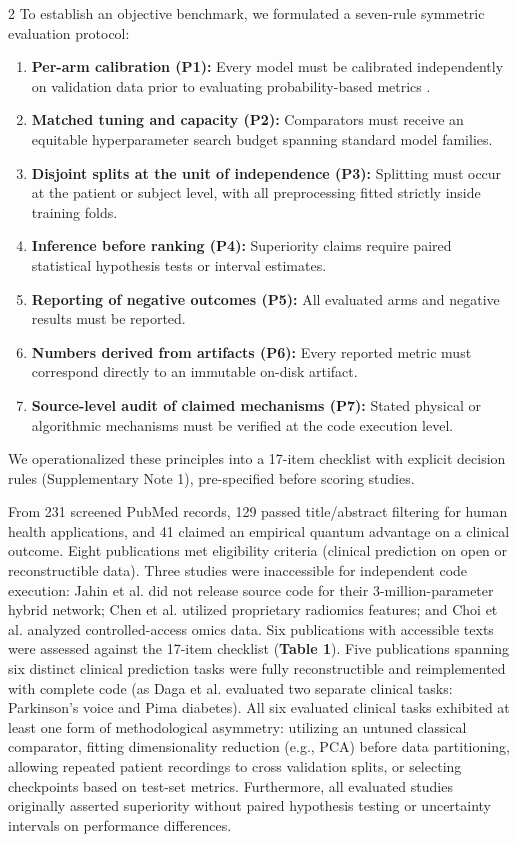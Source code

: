 \documentclass[10pt,a4paper,twoside]{article}
\begin{document}
\begin{multicols}{2}
To establish an objective benchmark, we formulated a seven-rule symmetric evaluation protocol:
\begin{enumerate}
  \setlength{\itemsep}{1pt}
  \setlength{\parskip}{0pt}
  \item \textbf{Per-arm calibration (P1):} Every model must be calibrated independently on validation data prior to evaluating probability-based metrics \cite{platt1999,guo2017}.
  \item \textbf{Matched tuning and capacity (P2):} Comparators must receive an equitable hyperparameter search budget spanning standard model families.
  \item \textbf{Disjoint splits at the unit of independence (P3):} Splitting must occur at the patient or subject level, with all preprocessing fitted strictly inside training folds.
  \item \textbf{Inference before ranking (P4):} Superiority claims require paired statistical hypothesis tests or interval estimates.
  \item \textbf{Reporting of negative outcomes (P5):} All evaluated arms and negative results must be reported.
  \item \textbf{Numbers derived from artifacts (P6):} Every reported metric must correspond directly to an immutable on-disk artifact.
  \item \textbf{Source-level audit of claimed mechanisms (P7):} Stated physical or algorithmic mechanisms must be verified at the code execution level.
\end{enumerate}

We operationalized these principles into a 17-item checklist with explicit decision rules (Supplementary Note 1), pre-specified before scoring studies.

From 231 screened PubMed records, 129 passed title/abstract filtering for human health applications, and 41 claimed an empirical quantum advantage on a clinical outcome. Eight publications met eligibility criteria (clinical prediction on open or reconstructible data). Three studies were inaccessible for independent code execution: Jahin et al. \cite{jahin2025} did not release source code for their 3-million-parameter hybrid network; Chen et al. \cite{chen2026} utilized proprietary radiomics features; and Choi et al. \cite{choi2026} analyzed controlled-access omics data. Six publications with accessible texts were assessed against the 17-item checklist (\textbf{Table 1}). Five publications spanning six distinct clinical prediction tasks were fully reconstructible and reimplemented with complete code (as Daga et al. \cite{daga2026} evaluated two separate clinical tasks: Parkinson's voice and Pima diabetes). All six evaluated clinical tasks exhibited at least one form of methodological asymmetry: utilizing an untuned classical comparator, fitting dimensionality reduction (e.g., PCA) before data partitioning, allowing repeated patient recordings to cross validation splits, or selecting checkpoints based on test-set metrics. Furthermore, all evaluated studies originally asserted superiority without paired hypothesis testing or uncertainty intervals on performance differences.

\end{multicols}
\end{document}
